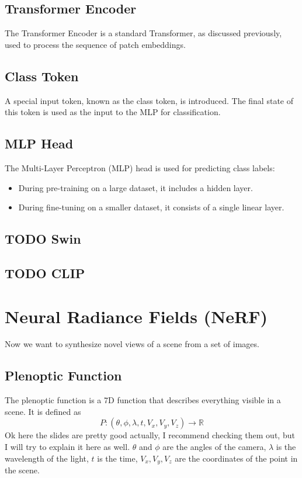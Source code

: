 \documentclass[a4paper]{article}
\begin{document}
\subsection{Transformer Encoder}

The Transformer Encoder is a standard Transformer, as discussed previously, used to process the sequence of patch embeddings.

\subsection{Class Token}

A special input token, known as the class token, is introduced. The final state of this token is used as the input to the MLP for classification.

\subsection{MLP Head}

The Multi-Layer Perceptron (MLP) head is used for predicting class labels:
\begin{itemize}
    \item During pre-training on a large dataset, it includes a hidden layer.
    \item During fine-tuning on a smaller dataset, it consists of a single linear layer.
\end{itemize}
\subsection{TODO Swin}
\subsection{TODO CLIP}
\section{Neural Radiance Fields (NeRF)}
Now we want to synthesize novel views of a scene from a set of images. 
\subsection{Plenoptic Function}
The plenoptic function is a 7D function that describes everything visible in a scene. It is defined as $$P: (\theta, \phi, \lambda, t, V_x, V_y, V_z) \rightarrow \mathbb{R}$$
Ok here the slides are pretty good actually, I recommend checking them out, but I will try to explain it here as well. $\theta$ and $\phi$ are the angles of the camera, $\lambda$ is the wavelength of the light, $t$ is the time, $V_x, V_y, V_z$ are the coordinates of the point in the scene.
\end{document}
